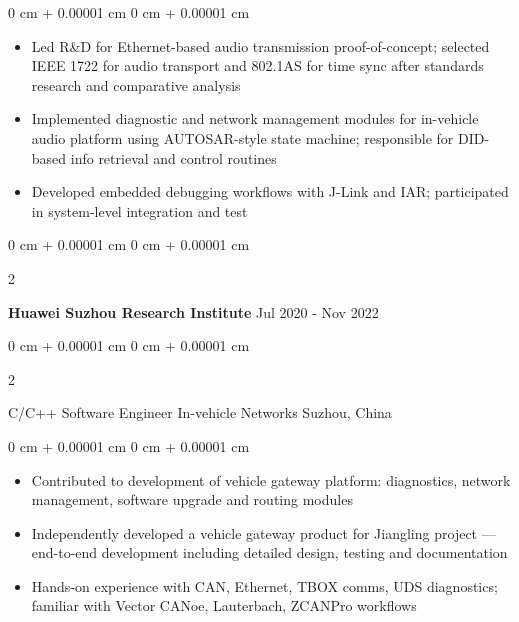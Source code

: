 \documentclass[10pt, a4paper]{article}
\newenvironment{highlights}{
    \begin{itemize}[
        topsep=0.15 cm,
        parsep=0.08 cm,
        partopsep=0pt,
        itemsep=0.05 cm,
        leftmargin=0 cm + 10pt
    ]
}{
    \end{itemize}
} %
\newenvironment{onecolentry}{
    \begin{adjustwidth}{
        0 cm + 0.00001 cm
    }{
        0 cm + 0.00001 cm
    }
}{
    \end{adjustwidth}
} %
\newenvironment{twocolentry}[2][]{
    \onecolentry
    \def\secondColumn{#2}
    \setcolumnwidth{\fill, 4.5 cm}
    \begin{paracol}{2}
}{
    \switchcolumn \raggedleft \secondColumn
    \end{paracol}
    \endonecolentry
} %
\begin{document}
        \vspace{0.10 cm}
        \begin{onecolentry}
            \begin{highlights}
                \item Led R\&D for Ethernet-based audio transmission proof-of-concept; selected IEEE 1722 for audio transport and 802.1AS for time sync after standards research and comparative analysis
                \item Implemented diagnostic and network management modules for in-vehicle audio platform using AUTOSAR-style state machine; responsible for DID-based info retrieval and control routines
                \item Developed embedded debugging workflows with J-Link and IAR; participated in system-level integration and test
            \end{highlights}
        \end{onecolentry}

        \vspace{0.2 cm}

        \begin{twocolentry}{
            Jul 2020 - Nov 2022
        }
            \textbf{Huawei Suzhou Research Institute}\end{twocolentry}

        \begin{twocolentry}{
            Suzhou, China
        }
            C/C++ Software Engineer In-vehicle Networks\end{twocolentry}

        \vspace{0.10 cm}
        \begin{onecolentry}
            \begin{highlights}
                \item Contributed to development of vehicle gateway platform: diagnostics, network management, software upgrade and routing modules
                \item Independently developed a vehicle gateway product for Jiangling project — end-to-end development including detailed design, testing and documentation
                \item Hands-on experience with CAN, Ethernet, TBOX comms, UDS diagnostics; familiar with Vector CANoe, Lauterbach, ZCANPro workflows
            \end{highlights}
        \end{onecolentry}
\end{document}
